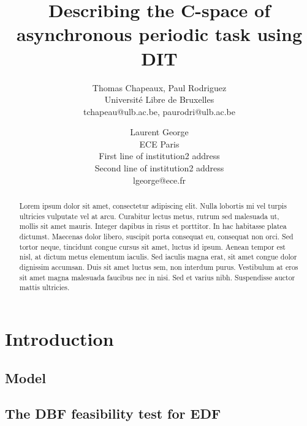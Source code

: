 \documentclass[times, 10pt,twocolumn, a4paper]{article}
\begin{document}
\title{Describing the C-space of asynchronous periodic task using DIT}

\author{Thomas Chapeaux, Paul Rodriguez\\
Universit\'e Libre de Bruxelles\\ tchapeau@ulb.ac.be, paurodri@ulb.ac.be \\
\and
Laurent George\\
ECE Paris\\
First line of institution2 address\\ Second line of institution2 address\\
lgeorge@ece.fr\\
}

\maketitle
\thispagestyle{empty}

\begin{abstract}
   Lorem ipsum dolor sit amet, consectetur adipiscing elit. Nulla lobortis mi vel turpis ultricies vulputate vel at arcu. Curabitur lectus metus, rutrum sed malesuada ut, mollis sit amet mauris. Integer dapibus in risus et porttitor. In hac habitasse platea dictumst. Maecenas dolor libero, suscipit porta consequat eu, consequat non orci. Sed tortor neque, tincidunt congue cursus sit amet, luctus id ipsum. Aenean tempor est nisl, at dictum metus elementum iaculis. Sed iaculis magna erat, sit amet congue dolor dignissim accumsan. Duis sit amet luctus sem, non interdum purus. Vestibulum at eros sit amet magna malesuada faucibus nec in nisi. Sed et varius nibh. Suspendisse auctor mattis ultricies.
\end{abstract}


\section{Introduction}

  \subsection{Model}

  \subsection{The DBF feasibility test for EDF}
\end{document}
